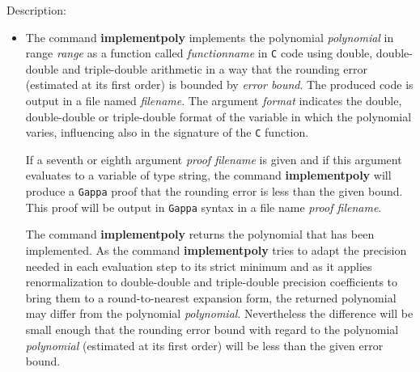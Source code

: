 \noindent Description: \begin{itemize}

\item The command \textbf{implementpoly} implements the polynomial \emph{polynomial} in range
   \emph{range} as a function called \emph{functionname} in \texttt{C} code
   using double, double-double and triple-double arithmetic in a way that
   the rounding error (estimated at its first order) is bounded by \emph{error bound}. 
   The produced code is output in a file named \emph{filename}. The
   argument \emph{format} indicates the double, double-double or triple-double
   format of the variable in which the polynomial varies, influencing
   also in the signature of the \texttt{C} function.
    
   If a seventh or eighth argument \emph{proof filename} is given and if this
   argument evaluates to a variable of type \textsf{string}, the command
   \textbf{implementpoly} will produce a \texttt{Gappa} proof that the
   rounding error is less than the given bound. This proof will be output
   in \texttt{Gappa} syntax in a file name \emph{proof filename}.
    
   The command \textbf{implementpoly} returns the polynomial that has been
   implemented. As the command \textbf{implementpoly} tries to adapt the precision
   needed in each evaluation step to its strict minimum and as it applies
   renormalization to double-double and triple-double precision
   coefficients to bring them to a round-to-nearest expansion form, the
   returned polynomial may differ from the polynomial
   \emph{polynomial}. Nevertheless the difference will be small enough that
   the rounding error bound with regard to the polynomial \emph{polynomial}
   (estimated at its first order) will be less than the given error
   bound.
    

\end{itemize}
